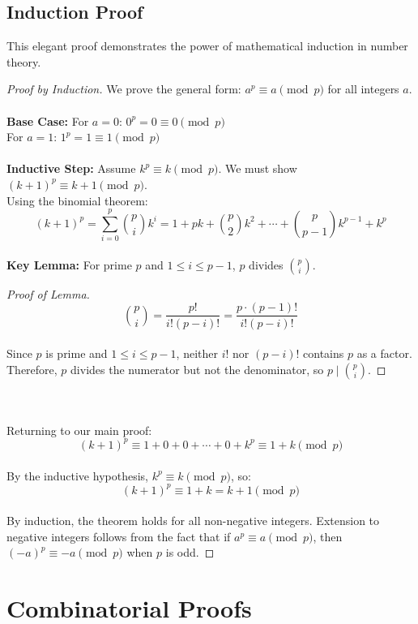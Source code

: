 \documentclass[12pt,openany]{book}
\theoremstyle{definition}
\theoremstyle{plain}
\theoremstyle{remark}
\begin{document}
\section{Induction Proof}

This elegant proof demonstrates the power of mathematical induction in number theory.

\begin{proof}[Proof by Induction]
We prove the general form: $a^p \equiv a \pmod{p}$ for all integers $a$.
\noindent
\\
\\
\textbf{Base Case:} For $a = 0$: $0^p = 0 \equiv 0 \pmod{p}$
\noindent
\\
For $a = 1$: $1^p = 1 \equiv 1 \pmod{p}$
\noindent
\\
\\
\textbf{Inductive Step:} Assume $k^p \equiv k \pmod{p}$. We must show $(k+1)^p \equiv k+1 \pmod{p}$.
\noindent
\\
Using the binomial theorem:
\[
(k+1)^p = \sum_{i=0}^{p} \binom{p}{i} k^i = 1 + pk + \binom{p}{2}k^2 + \cdots + \binom{p}{p-1}k^{p-1} + k^p
\]
\noindent
\\
\textbf{Key Lemma:} For prime $p$ and $1 \leq i \leq p-1$, $p$ divides $\binom{p}{i}$.

\begin{proof}[Proof of Lemma]
\[
\binom{p}{i} = \frac{p!}{i!(p-i)!} = \frac{p \cdot (p-1)!}{i!(p-i)!}
\]
\noindent
\\
Since $p$ is prime and $1 \leq i \leq p-1$, neither $i!$ nor $(p-i)!$ contains $p$ as a factor. Therefore, $p$ divides the numerator but not the denominator, so $p \mid \binom{p}{i}$.
\end{proof}
\noindent
\\ \\
Returning to our main proof:
\[
(k+1)^p \equiv 1 + 0 + 0 + \cdots + 0 + k^p \equiv 1 + k \pmod{p}
\]
\noindent
\\
By the inductive hypothesis, $k^p \equiv k \pmod{p}$, so:
\[
(k+1)^p \equiv 1 + k = k+1 \pmod{p}
\]
\noindent
\\
By induction, the theorem holds for all non-negative integers. Extension to negative integers follows from the fact that if $a^p \equiv a \pmod{p}$, then $(-a)^p \equiv -a \pmod{p}$ when $p$ is odd.
\end{proof}

\chapter{Combinatorial Proofs}
\end{document}
